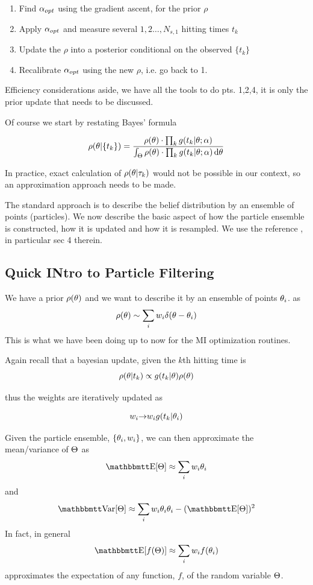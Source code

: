 \documentclass{article}
\begin{document}
\begin{enumerate}
  \item Find ${{\alpha}_{opt} }$ using the gradient ascent, for the prior $\rho$
  \item Apply ${{\alpha}_{opt} }$ and measure several $1,2\ldots,N_{s,1}$ hitting times
  $t_k$
  \item Update the $\rho$ into a posterior conditional on the observed $\{t_k\}$
  \item Recalibrate ${{\alpha}_{opt} }$ using the new $\rho$, i.e. go back to 1. 
\end{enumerate}

 Efficiency considerations aside, we have all the tools to do pts. 1,2,4, it
 is only the prior update that needs to be discussed. 

Of course we start by restating Bayes' formula

$$
\rho({\theta}| \{t_k\} ) = 
\frac{  \rho({\theta}) \cdot \prod_k g(t_k|{\theta} ; {\alpha}) }
	 { \int_{\Theta}  \rho({\theta}) \cdot \prod_k g(t_k|{\theta} ; {\alpha})  \, \mathrm{d} {\theta}}
$$

In practice, exact calculation of $\rho({\theta}|{\tau}_k)$ would not be possible in our
context, so an approximation approach needs to be made.

The standard approach is to describe the belief distribution by an ensemble of
points (particles). We now describe the basic aspect of how the particle
ensemble is constructed, how it is updated and how it is resampled. We use the
reference \cite{Granade2012}, in particular sec 4 therein.

\subsection{Quick INtro to Particle Filtering}
We have a prior
$ \rho({\theta})$ and we want to describe it by an ensemble of points ${\theta}_i$.
as 
$$ \rho({\theta}) \sim \sum_i w_i \delta({\theta}-{\theta}_i)$$
This is what we have been doing up to now for the MI optimization routines.

Again recall that a bayesian update, given the $k$th hitting time is
$$ \rho({\theta}|t_k) \propto g(t_k|{\theta})\rho({\theta})$$

thus the weights are iteratively updated as 

$$w_i {\rightarrow} w_i g(t_k|{\theta}_i)$$

Given the particle ensemble, $\{{\theta}_i, w_i\}$, we can  then approximate the
mean/variance of ${\Theta}$ as
$$ \Exp[\Th] \approx \sum_i w_i \th_i$$
and 
$$ \Var[\Th] \approx \sum_i w_i \th_i \th_i - (\Exp[\Th])^2$$
In fact, in general 
$$\Exp[f(\Th)]\approx\sum_i w_i f(\th_i)$$ approximates the expectation of any
function, $f$, of the random variable ${\Theta}$.
\end{document}
